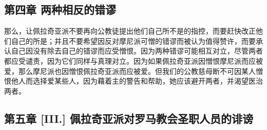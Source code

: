 
\subsection{第四章 两种相反的错谬}

那么，让佩拉奇亚派不要再向公教徒提出他们自己所不是的指控，而要赶快改正他们自己的所是；并且不要希望因反对摩尼派可憎的错谬而被认为值得赞许，而要承认自己因没有除去自己的错谬而应受憎恨。因为两种错谬可能相互对立，尽管两者都应受谴责，因为它们同样与真理对立。因为如果佩拉奇亚派因憎恨摩尼派而应被爱，那么摩尼派也因憎恨佩拉奇亚派而应被爱。但我们的公教慈母断不可因某人憎恨他人而选择爱某些人，因为藉着主的警告和帮助，她应该避开两者，并渴望医治两者。\par


\subsection{第五章 [III.] 佩拉奇亚派对罗马教会圣职人员的诽谤}

